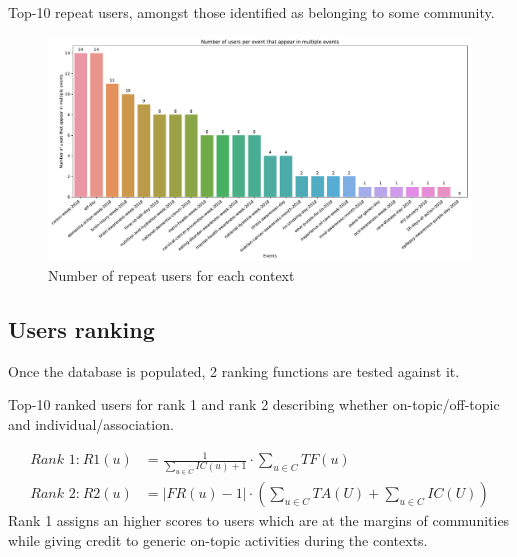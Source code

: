 \begin{table}
	\centering
	\resizebox{\textwidth}{!}{
		
	}
	\caption{Top-10 repeat users, amongst those identified as belonging to some community.}
	\label{tab:repeat-users}
\end{table}

\begin{figure}
	\centering
	\includegraphics[width=\textwidth]{figures/repeat-users-frequency}
	\caption{Number of repeat users for each context}
	\label{fig:repeat-users-frequency}
\end{figure}

\subsection{Users ranking} \label{sec:ranking}

Once the database is populated, 2 ranking functions are tested against it.
%
\begin{table}
	\centering
	\resizebox{\textwidth}{!}{
		
	}
	\caption{Top-10 ranked users for rank 1 and rank 2 describing whether on-topic/off-topic and individual/association.}
	\label{tab:rank1}
\end{table}
%
\begin{align}
\textit{Rank 1:} ~ \mathit{R1}(u) & = \frac{1}{\sum_{u \in C} \mathit{IC}(u) + 1} \cdot \sum_{u \in C} \mathit{TF}(u) \label{eq:rank1} \\
\textit{Rank 2:} ~ \mathit{R2}(u) & = \lvert \mathit{FR}(u) - 1 \rvert \cdot \left(\sum_{u \in C} \mathit{TA}(U) + \sum_{u \in C} \mathit{IC}(U)\right) \label{eq:rank1}
\end{align}
%
Rank 1 assigns an higher scores to users which are at the margins of communities while giving credit to generic on-topic activities during the contexts.

